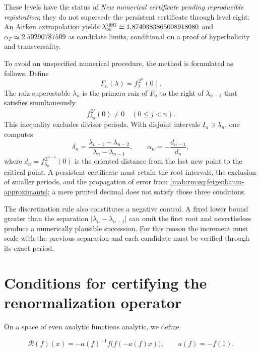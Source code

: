 These levels have the status of \emph{New numerical certificate
pending reproducible registration}; they do not supersede the persistent certificate
through level eight. An Aitken extrapolation yields
\(\lambda_\infty^{\HMT}\simeq1.8740383865008918080\) and
\(\alpha_F\simeq2.50290787509\) as candidate limits, conditional on
a proof of hyperbolicity and transversality.

To avoid an unspecified numerical procedure, the method is formulated as
follows. Define
\begin{equation}
F_n(\lambda)=f_\lambda^{\,2^n}(0).
\label{mab:rm:eq:superstable-equation}
\end{equation}
The raiz superestable \(\lambda_n\) is the primera raiz of \(F_n\) to the
right of \(\lambda_{n-1}\) that satisfies simultaneously
\[
f_{\lambda_n}^{\,2^j}(0)\ne0
\quad(0\le j<n).
\]
This inequality excludes divisor periods. With disjoint intervals
\(I_n\ni\lambda_n\), one computes
\begin{equation}
\delta_n=
\frac{\lambda_{n-1}-\lambda_{n-2}}
     {\lambda_n-\lambda_{n-1}},
\qquad
\alpha_n=-\frac{d_{n-1}}{d_n},
\label{mab:rm:eq:feigenbaum-approximants}
\end{equation}
where \(d_n=f_{\lambda_n}^{\,2^{n-1}}(0)\) is the oriented distance from the
last new point to the critical point. A persistent certificate must retain
the root intervals, the exclusion of smaller periods, and the propagation
of error from \cref{mab:rm:eq:feigenbaum-approximants}; a mere printed decimal does not
satisfy those three conditions.

The discretization rule also constitutes a negative control. A
fixed lower bound greater than the separation
\(|\lambda_n-\lambda_{n-1}|\) can omit the first root and nevertheless produce a numerically plausible
succession. For this reason the increment
must scale with the previous separation and each candidate must be verified
through its exact period.

\section{Conditions for certifying the renormalization operator}

On a space of even analytic functions analytic, we define

\begin{equation}
\mathcal R(f)(x)=-a(f)^{-1}f\bigl(f(-a(f)x)\bigr),
\qquad a(f)=-f(1).
\label{mab:rm:eq:renormalization}
\end{equation}

